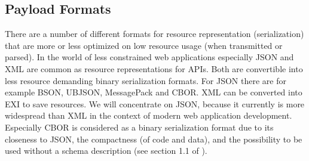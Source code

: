 	\subsection{Payload Formats}
	\label{cha:background:coap:payload}

		There are a number of different formats for resource representation
		(serialization) that are more or less optimized on low resource usage
		(when transmitted or parsed). In the world of less constrained web
		applications especially \ac{JSON} and \ac{XML} are common as resource
		representations for \acp{API}. Both are convertible into less resource
		demanding binary serialization formats. For \ac{JSON} there are for
		example \ac{BSON}, \ac{UBJSON}, MessagePack and \ac{CBOR}. \ac{XML} can
		be converted into \ac{EXI} to save resources. We will concentrate on
		\ac{JSON}, because it currently is more widespread than \ac{XML} in the
		context of modern web application development. Especially \ac{CBOR} is
		considered as a binary serialization format due to its closeness to
		\ac{JSON}, the compactness (of code and data), and the possibility to
		be used without a schema description (see section 1.1 of \cite{cbor}).

